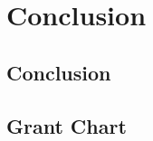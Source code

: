 
\chapter{Conclusion}\doublespacing %


\section{Conclusion}







\section{Grant Chart}










































